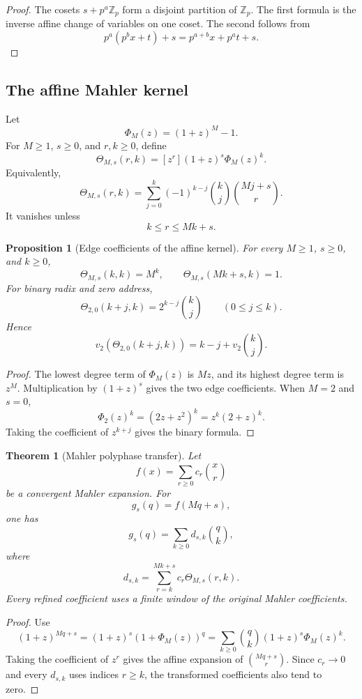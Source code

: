 \documentclass{aomart}
\newtheorem{theorem}{Theorem}[section]
\newtheorem{proposition}[proposition]{Proposition}
\theoremstyle{definition}
\theoremstyle{remark}
\newcommand{\vTwo}{v_2}
\begin{document}
\begin{proof}
The cosets \(s+p^a\mathbb Z_p\) form a disjoint partition of \(\mathbb Z_p\). The first formula is the inverse affine change of variables on one coset. The second follows from
\[
p^a(p^bx+t)+s
=
p^{a+b}x+p^at+s.
\]
\end{proof}

\subsection{The affine Mahler kernel}

Let
\[
\Phi_M(z)=(1+z)^M-1.
\]
For \(M\geq1\), \(s\geq0\), and \(r,k\geq0\), define
\[
\boxed{
\Theta_{M,s}(r,k)
=
[z^r](1+z)^s\Phi_M(z)^k.
}
\]
Equivalently,
\[
\boxed{
\Theta_{M,s}(r,k)
=
\sum_{j=0}^{k}
(-1)^{k-j}\binom kj\binom{Mj+s}{r}.
}
\]
It vanishes unless
\[
k\leq r\leq Mk+s.
\]

\begin{proposition}[Edge coefficients of the affine kernel]\label{prop:affine_kernel_edges}
For every \(M\geq1\), \(s\geq0\), and \(k\geq0\),
\[
\boxed{
\Theta_{M,s}(k,k)=M^k,
\qquad
\Theta_{M,s}(Mk+s,k)=1.
}
\]
For binary radix and zero address,
\[
\boxed{
\Theta_{2,0}(k+j,k)
=
2^{k-j}\binom kj
\qquad(0\leq j\leq k).
}
\]
Hence
\[
\boxed{
\vTwo\left(\Theta_{2,0}(k+j,k)\right)
=
k-j+\vTwo\binom kj.
}
\]
\end{proposition}

\begin{proof}
The lowest degree term of \(\Phi_M(z)\) is \(Mz\), and its highest degree term is \(z^M\). Multiplication by \((1+z)^s\) gives the two edge coefficients. When \(M=2\) and \(s=0\),
\[
\Phi_2(z)^k
=
(2z+z^2)^k
=
z^k(2+z)^k.
\]
Taking the coefficient of \(z^{k+j}\) gives the binary formula.
\end{proof}

\begin{theorem}[Mahler polyphase transfer]\label{thm:mahler_polyphase_transfer}
Let
\[
f(x)=\sum_{r\geq0}c_r\binom xr
\]
be a convergent Mahler expansion. For
\[
g_s(q)=f(Mq+s),
\]
one has
\[
\boxed{
g_s(q)=\sum_{k\geq0}d_{s,k}\binom qk,}
\]
where
\[
\boxed{
d_{s,k}
=
\sum_{r=k}^{Mk+s}
c_r\Theta_{M,s}(r,k).
}
\]
Every refined coefficient uses a finite window of the original Mahler coefficients.
\end{theorem}

\begin{proof}
Use
\[
(1+z)^{Mq+s}
=
(1+z)^s\left(1+\Phi_M(z)\right)^q
=
\sum_{k\geq0}\binom qk(1+z)^s\Phi_M(z)^k.
\]
Taking the coefficient of \(z^r\) gives the affine expansion of \(\binom{Mq+s}{r}\). Since \(c_r\to0\) and every \(d_{s,k}\) uses indices \(r\geq k\), the transformed coefficients also tend to zero.
\end{proof}
\end{document}

